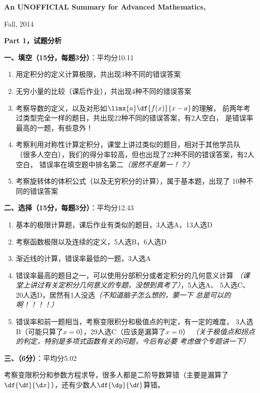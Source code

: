 {\large\bf An UNOFFICIAL Summary for Advanced Mathematics, 

Fall, 2014}
\bigskip

{\large\bf Part 1，试题分析}
\bigskip

{\bf 一、填空（15分，每题3分）}：平均分10.11

\begin{enumerate}
  \setlength{\itemindent}{1cm}
  \item 用定积分的定义计算极限，共出现3种不同的错误答案
  \item 无穷小量的比较（课后作业），共出现4种不同的错误答案
  \item 考察导数的定义，以及对形如$\limx{a}\df{f(x)}{x-a}$的理解，
  前两年考过类型完全一样的题目，共出现22种不同的错误答案，有2人空白，
  是错误率最高的一题，有些意外！
  \item 考察利用对称性计算定积分，课堂上讲过类似的题目，相对于其他学员队
  （很多人空白），我们的得分率较高，但也出现了22种不同的错误答案，有2人空白，
  错误率在填空题中排名第二{\it（居然不是第一！？）}
  \item 考察旋转体的体积公式（以及无穷积分的计算），属于基本题，出现了
  10种不同的错误答案
\end{enumerate}

{\bf 二、选择（15分，每题3分）}：平均分12.43

\begin{enumerate}
  \setlength{\itemindent}{1cm}
  \item 基本的极限计算题，课后作业有类似的题目，3人选A，13人选D
  \item 考察函数极限以及连续的定义，5人选B，6人选D
  \item 渐近线的计算，错误率最低的一题，3人选A
  \item 错误率最高的题目之一，可以使用分部积分或者定积分的几何意义计算
  {\it （课堂上讲过有关定积分几何意义的专题，没想到真考了）}，5人选A、
  5人选C、20人选D，居然有1人没选{\it （不知道脑子怎么想的，蒙一下
  总是可以的啊！！！！）}
  \item 错误率和前一题相当，考察变限积分和极值点的判定，有一定的难度，
  3人选B（可能只算了$x=0$），29人选C（应该是漏算了$x=0$）
  {\it （关于极值点和拐点的判定，特别是多项式函数有关的问题，今后有必要
  考虑做个专题讲一下）}
\end{enumerate}

{\bf 三、（6分）}：平均分5.02

考察变限积分和参数方程求导，很多人都是二阶导数算错（主要是漏算了$\df{\d t}
{\d x}$），还有少数人$\df{\d y}{\d t}$算错。

